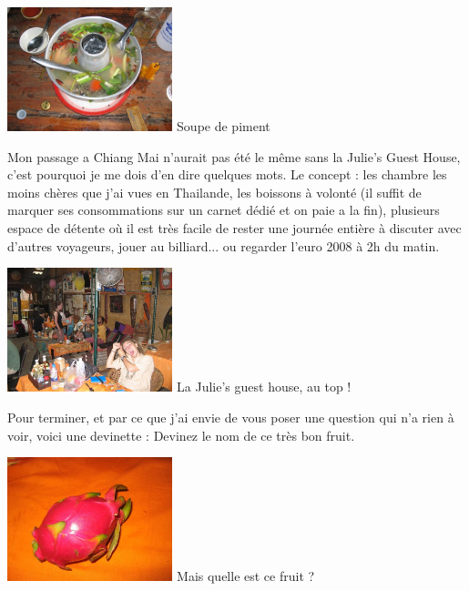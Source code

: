 \begin{multicols}{2}
\hspace*{-0.65cm}
\includegraphics[width=4.8cm]{articles/Chiang-mai/1214286184dsFU.jpg}
Soupe de piment


Mon passage a Chiang Mai n'aurait pas été le même sans la Julie's Guest House, c'est pourquoi je me dois d'en dire quelques mots. Le concept : les chambre les moins chères que j'ai vues en Thailande, les boissons à volonté (il suffit de marquer ses consommations sur un carnet dédié et on paie a la fin), plusieurs espace de détente où il est très facile de rester une journée entière à discuter avec d'autres voyageurs, jouer au billiard... ou regarder l'euro 2008 à 2h du matin.

\hspace*{-0.65cm}
\includegraphics[width=4.8cm]{articles/Chiang-mai/1214471834JD3r.jpg}
La Julie's guest house, au top !


Pour terminer, et par ce que j'ai envie de vous poser une question qui n'a rien à voir, voici une devinette : Devinez le nom de ce très bon fruit.

\hspace*{-0.65cm}
\includegraphics[width=4.8cm]{articles/Chiang-mai/1214471825EGhM.jpg}
Mais quelle est ce fruit ?

\end{multicols}
